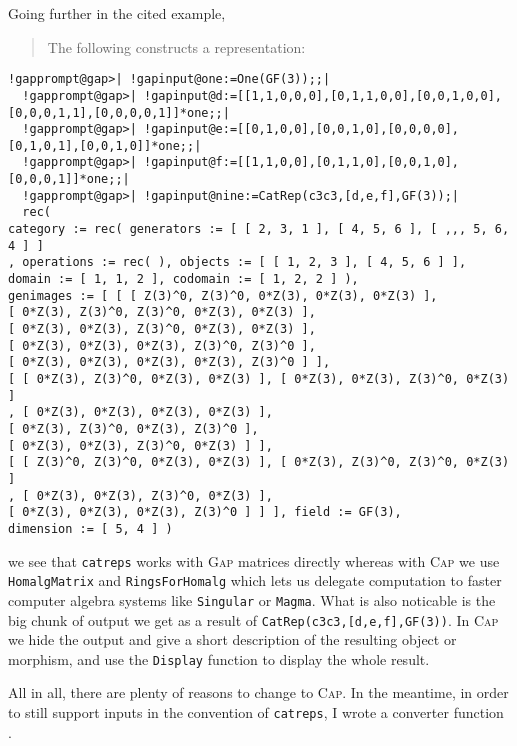 Going further in the cited example,\\
\blockquote[\cite{[Webb2020]}]{The following constructs a representation:}
\begin{Verbatim}[commandchars=!@|,fontsize=\small,frame=single,label=Example]
  !gapprompt@gap>| !gapinput@one:=One(GF(3));;|
  !gapprompt@gap>| !gapinput@d:=[[1,1,0,0,0],[0,1,1,0,0],[0,0,1,0,0],[0,0,0,1,1],[0,0,0,0,1]]*one;;|
  !gapprompt@gap>| !gapinput@e:=[[0,1,0,0],[0,0,1,0],[0,0,0,0],[0,1,0,1],[0,0,1,0]]*one;;|
  !gapprompt@gap>| !gapinput@f:=[[1,1,0,0],[0,1,1,0],[0,0,1,0],[0,0,0,1]]*one;;|
  !gapprompt@gap>| !gapinput@nine:=CatRep(c3c3,[d,e,f],GF(3));|
  rec(
category := rec( generators := [ [ 2, 3, 1 ], [ 4, 5, 6 ], [ ,,, 5, 6, 4 ] ]
, operations := rec( ), objects := [ [ 1, 2, 3 ], [ 4, 5, 6 ] ],
domain := [ 1, 1, 2 ], codomain := [ 1, 2, 2 ] ),
genimages := [ [ [ Z(3)^0, Z(3)^0, 0*Z(3), 0*Z(3), 0*Z(3) ],
[ 0*Z(3), Z(3)^0, Z(3)^0, 0*Z(3), 0*Z(3) ],
[ 0*Z(3), 0*Z(3), Z(3)^0, 0*Z(3), 0*Z(3) ],
[ 0*Z(3), 0*Z(3), 0*Z(3), Z(3)^0, Z(3)^0 ],
[ 0*Z(3), 0*Z(3), 0*Z(3), 0*Z(3), Z(3)^0 ] ],
[ [ 0*Z(3), Z(3)^0, 0*Z(3), 0*Z(3) ], [ 0*Z(3), 0*Z(3), Z(3)^0, 0*Z(3) ]
, [ 0*Z(3), 0*Z(3), 0*Z(3), 0*Z(3) ],
[ 0*Z(3), Z(3)^0, 0*Z(3), Z(3)^0 ],
[ 0*Z(3), 0*Z(3), Z(3)^0, 0*Z(3) ] ],
[ [ Z(3)^0, Z(3)^0, 0*Z(3), 0*Z(3) ], [ 0*Z(3), Z(3)^0, Z(3)^0, 0*Z(3) ]
, [ 0*Z(3), 0*Z(3), Z(3)^0, 0*Z(3) ],
[ 0*Z(3), 0*Z(3), 0*Z(3), Z(3)^0 ] ] ], field := GF(3),
dimension := [ 5, 4 ] )
\end{Verbatim}

we see that \texttt{catreps} works with \textsc{Gap} matrices directly whereas with \textsc{Cap} we use \texttt{HomalgMatrix} and
\texttt{RingsForHomalg} which lets us delegate computation to faster computer algebra systems like \texttt{Singular} or \texttt{Magma}.
What is also noticable is the big chunk of output we get as a result of \texttt{CatRep(c3c3,[d,e,f],GF(3))}. In \textsc{Cap} we hide the output
and give a short description of the resulting object or morphism, and use the \texttt{Display} function to display the whole result.

All in all, there are plenty of reasons to change to \textsc{Cap}. In the meantime, in order to still support inputs in the convention of
\texttt{catreps}, I wrote a converter function .